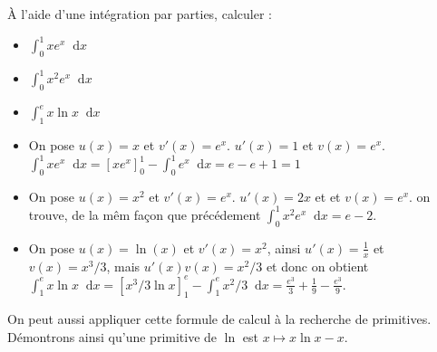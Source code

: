 \documentclass[11pt,a4paper,french]{article}
\newcommand{\diff}{\mathop{}\mathopen{}\mathrm{d}}
\theoremstyle{break}
\theoremstyle{plain}
\theoremstyle{nonumberplain}
\theoremstyle{nonumberbreak}
\begin{document}
\begin{question}
  À l'aide d'une intégration par parties, calculer :
  \begin{itemize}
    \item $\int_0^1 xe^x \diff x$
    \item $\int_0^1 x^2e^x \diff x$
    \item $\int_1^e x\ln x \diff x$
  \end{itemize}
\end{question}
\begin{solution}
  \begin{itemize}
    \item On pose $u(x) = x$ et $v'(x) = e^x$.  $u'(x) = 1$ et $v(x) =
      e^x$. $\int_0^1 xe^x \diff x = [xe^x]_0^1 - \int_0^1 e^x \diff x =
      e - e + 1 = 1$
    \item On pose $u(x) = x^2$ et $v'(x) = e^x$.  $u'(x) = 2x$ et et
      $v(x) = e^x$. on trouve, de la mêm façon que précédement $\int_0^1
      x^2e^x \diff x = e - 2$.
    \item On pose $u(x) = \ln(x) $ et $v'(x) = x^2$, ainsi $u'(x) =
      \frac1x$ et $v(x) = x^3/3$, mais $u'(x)v(x) = x^2/3$ et donc on
      obtient $\int_1^e x\ln x \diff x = [x^3/3\ln x]_1^e - \int_1^e
      x^2/3 \diff x = \frac{e^3}3 + \frac19 - \frac{e^3}9$.
  \end{itemize}
\end{solution}

On peut aussi appliquer cette formule de calcul à la recherche de
primitives. Démontrons ainsi qu'une primitive de $\ln$ est $x \mapsto
x\ln x - x$.

\pagebreak
\end{document}

